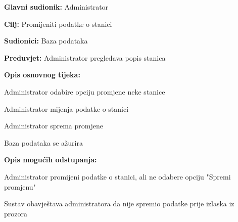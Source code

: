 		\noindent {}
		\begin{packed_item}
			
			\item \textbf{Glavni sudionik: }Administrator
			\item  \textbf{Cilj:} Promijeniti podatke o stanici
			\item  \textbf{Sudionici:} Baza podataka
			\item  \textbf{Preduvjet:} Administrator pregledava popis stanica
			\item  \textbf{Opis osnovnog tijeka:}
			
			\item[] \begin{packed_enum}
				
				\item Administrator odabire opciju promjene neke stanice
				\item Administrator mijenja podatke o stanici
				\item Administrator sprema promjene
				\item Baza podataka se ažurira
			\end{packed_enum}
			
			\item  \textbf{Opis mogućih odstupanja:}
			
			\item[] \begin{packed_item}
				
				\item[2.a] Administrator promijeni podatke o stanici, ali ne odabere opciju "Spremi promjenu"
				\item[] \begin{packed_enum}
					
					\item Sustav obavještava administratora da nije spremio podatke prije izlaska iz prozora
					
				\end{packed_enum}
			\end{packed_item}
		\end{packed_item}
	\newpage
		\noindent {}
